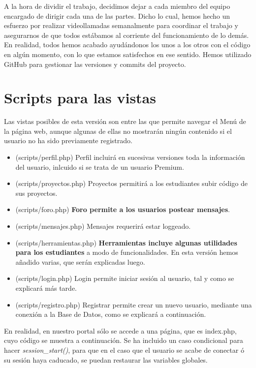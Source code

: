 \documentclass[12pt]{report}
\begin{document}
A la hora de dividir el trabajo, decidimos dejar a cada miembro del equipo encargado de dirigir cada una de las partes. Dicho lo cual, hemos hecho un esfuerzo por realizar videollamadas semanalmente para coordinar el trabajo y asegurarnos de que todos estábamos al corriente del funcionamiento de lo demás. En realidad, todos hemos acabado ayudándonos los unos a los otros con el código en algún momento, con lo que estamos satisfechos en ese sentido. Hemos utilizado GitHub para gestionar las versiones y commits del proyecto.

\newpage
\section{Scripts para las vistas}
Las vistas posibles de esta versión son entre las que permite navegar el Menú de la página web, aunque algunas de ellas no mostrarán ningún contenido si el usuario no ha sido previamente registrado.
\begin{itemize}
    \item (scripts/perfil.php) Perfil incluirá en sucesivas versiones toda la información del usuario, inlcuido si se trata de un usuario Premium.
    \item (scripts/proyectos.php) Proyectos permitirá a los estudiantes subir código de sus proyectos.
    \item (scripts/foro.php) \textbf{Foro permite a los usuarios postear mensajes}.
    \item (scripts/mensajes.php) Mensajes requerirá estar loggeado.
    \item (scripts/herramientas.php) \textbf{Herramientas incluye algunas utilidades para los estudiantes} a modo de funcionalidades. En esta versión hemos añadido varias, que serán explicadas luego.
    \item (scripts/login.php) Login permite iniciar sesión al usuario, tal y como se explicará más tarde. 
    \item (scripts/registro.php) Registrar permite crear un nuevo usuario, mediante una conexión a la Base de Datos, como se explicará a continuación.
\end{itemize}

En realidad, en nuestro portal sólo se accede a una página, que es index.php, cuyo código se muestra a continuación. Se ha incluido un caso condicional para hacer \textit{session\_start()}, para que en el caso que el usuario se acabe de conectar ó su sesión haya caducado, se puedan restaurar las variables globales.
\end{document}

